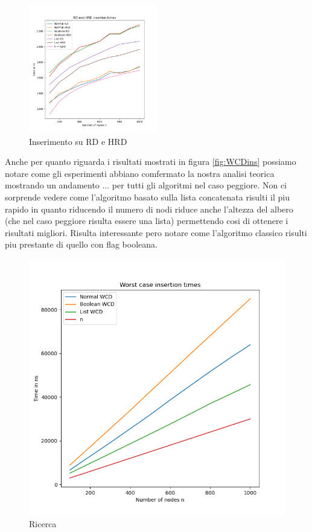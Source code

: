 \begin{figure}[H]
  \centering
  \includegraphics[width=0.5\textwidth]{Resources/ABR_Resources/RDeHRDinsertion.png}
  \caption{Inserimento su RD e HRD}
  \label{fig:RDHDins}
\end{figure}


Anche per quanto riguarda i risultati mostrati in figura \ref{fig:WCDins} possiamo notare come gli esperimenti abbiano comfermato la nostra analisi teorica mostrando
un andamento ... per tutti gli algoritmi nel caso peggiore. Non ci sorprende vedere come l'algoritmo basato sulla lista concatenata risulti il piu rapido in quanto
riducendo il numero di nodi riduce anche l'altezza del albero (che nel caso peggiore risulta essere una lista) permettendo cosi di ottenere i risultati migliori.
Risulta interessante pero notare come l'algoritmo classico risulti piu prestante di quello con flag booleana.
\begin{figure}[H]
  \centering
  \includegraphics[width=\textwidth]{Resources/ABR_Resources/WDinsertion.png}
  \caption{Ricerca}
  \label{fig:WDins}
\end{figure}


